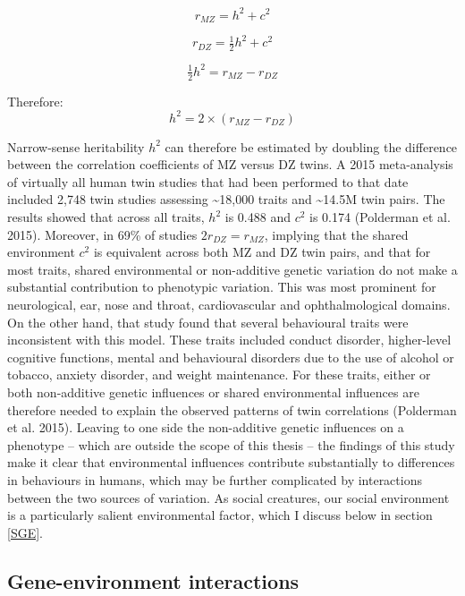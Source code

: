 \documentclass[
]{book}
\begin{document}
\begin{equation}
r_{MZ} = h^2 + c^2
\end{equation}

\begin{equation}
r_{DZ} = \tfrac{1}{2}h^2 + c^2
\end{equation}

\begin{equation}
\tfrac{1}{2}h^2 = r_{MZ} - r_{DZ}
\end{equation}

Therefore:
\begin{equation}
h^2 = 2\times(r_{MZ} - r_{DZ})
\end{equation}

Narrow-sense heritability \(h^2\) can therefore be estimated by doubling the difference between the correlation coefficients of MZ versus DZ twins. A 2015 meta-analysis of virtually all human twin studies that had been performed to that date included 2,748 twin studies assessing \textasciitilde18,000 traits and \textasciitilde14.5M twin pairs. The results showed that across all traits, \(h^2\) is 0.488 and \(c^2\) is 0.174 (Polderman et al. 2015). Moreover, in 69\% of studies \(2r_{DZ} = r_{MZ}\), implying that the shared environment \(c^2\) is equivalent across both MZ and DZ twin pairs, and that for most traits, shared environmental or non-additive genetic variation do not make a substantial contribution to phenotypic variation. This was most prominent for neurological, ear, nose and throat, cardiovascular and ophthalmological domains. On the other hand, that study found that several behavioural traits were inconsistent with this model. These traits included conduct disorder, higher-level cognitive functions, mental and behavioural disorders due to the use of alcohol or tobacco, anxiety disorder, and weight maintenance. For these traits, either or both non-additive genetic influences or shared environmental influences are therefore needed to explain the observed patterns of twin correlations (Polderman et al. 2015). Leaving to one side the non-additive genetic influences on a phenotype -- which are outside the scope of this thesis -- the findings of this study make it clear that environmental influences contribute substantially to differences in behaviours in humans, which may be further complicated by interactions between the two sources of variation. As social creatures, our social environment is a particularly salient environmental factor, which I discuss below in section \ref{SGE}.

\hypertarget{gene-environment-interactions}{%
\subsection{Gene-environment interactions}\label{gene-environment-interactions}}
\end{document}
